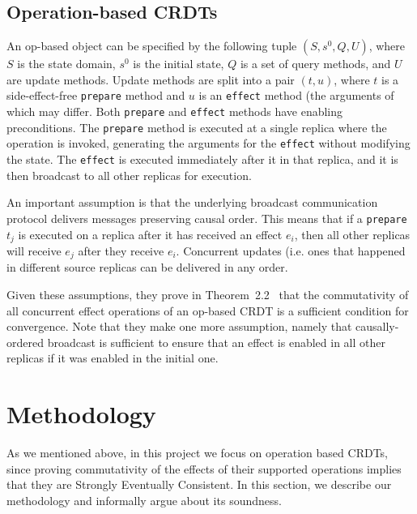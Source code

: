 \documentclass{article}
\begin{document}
\subsection{Operation-based CRDTs}

An op-based object can be specified by the following tuple $(S, s^0,
Q, U)$, where $S$ is the state domain, $s^0$ is the initial state, $Q$
is a set of query methods, and $U$ are update methods. Update methods
are split into a pair $(t,u)$, where $t$ is a side-effect-free
\texttt{prepare} method and $u$ is an \texttt{effect} method (the
arguments of which may differ. Both \texttt{prepare} and
\texttt{effect} methods have enabling preconditions. The
\texttt{prepare} method is executed at a single replica where the
operation is invoked, generating the arguments for the \texttt{effect}
without modifying the state. The \texttt{effect} is executed
immediately after it in that replica, and it is then broadcast to all
other replicas for execution.

An important assumption is that the underlying broadcast communication
protocol delivers messages preserving causal order. This means that if
a \texttt{prepare} $t_j$ is executed on a replica after it has
received an effect $e_i$, then all other replicas will receive $e_j$
after they receive $e_i$. Concurrent updates (i.e. ones that happened
in different source replicas can be delivered in any order.

Given these assumptions, they prove in
Theorem~2.2~\cite{shapiro2011conflict} that the commutativity of all
concurrent effect operations of an op-based CRDT is a sufficient
condition for convergence. Note that they make one more assumption,
namely that causally-ordered broadcast is sufficient to ensure that an
effect is enabled in all other replicas if it was enabled in the
initial one.



\section{Methodology}

As we mentioned above, in this project we focus on operation based
CRDTs, since proving commutativity of the effects of their supported
operations implies that they are Strongly Eventually Consistent. In
this section, we describe our methodology and informally argue about
its soundness.
\end{document}
